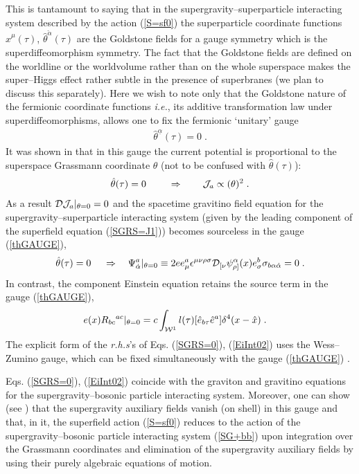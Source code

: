 \documentclass[a4paper,11pt]{article}
\begin{document}
This is tantamount to saying that 
in the supergravity--superparticle interacting system described by the action 
(\ref{S=sf0})
the superparticle coordinate functions $\hat{x}^\mu(\tau)$, 
$\hat{\theta}^{\check{\alpha}}(\tau)$ 
are  the Goldstone fields for a gauge symmetry which is the 
superdiffeomorphism symmetry. The fact that the Goldstone fields are 
defined on 
the worldline or the worldvolume rather than on the whole 
superspace makes the 
super--Higgs effect \cite{Volkov} rather subtle 
in the presence of superbranes (we plan to discuss this separately). 
Here we wish to note only that the Goldstone nature of the 
fermionic coordinate 
functions {\it i.e.}, its additive transformation law under 
superdiffeomorphisms, allows one to fix the fermionic `unitary' gauge 
\begin{eqnarray}\label{thGAUGE}
\hat{\theta}^{\underline{\alpha}}(\tau) = 0 \;  . 
\end{eqnarray}
It was shown in \cite{BAIL4} that in this gauge the current 
potential is proportional to the superspace Grassmann coordinate 
$\theta$ (not to be confused with $\hat{\theta}(\tau)$): 
\begin{eqnarray} \label{Ja=th3}
\hat{\theta}(\tau)=0 \;  
\qquad \Rightarrow \qquad 
{\cal J}_a \propto (\theta)^2 \; . 
\end{eqnarray}
As a result ${\cal D}{\cal J}_a\vert_{\theta =0}=0$ and the 
spacetime gravitino field equation for the supergravity--superparticle 
interacting system (given by the leading component of the 
superfield equation (\ref{SGRS=J1})) becomes sourceless
in the gauge (\ref{thGAUGE}), 
\begin{eqnarray}\label{SGRS=0}
\hat{\theta}(\tau)=0 \;  
\quad \Rightarrow  \quad
\Psi^a_{\dot\alpha} \vert_{\theta=0}\equiv 
2 e e_\mu^a \epsilon^{\mu\nu\rho\sigma} {\cal D}_{[\nu}\psi_{\rho]}^{\alpha}(x)
e^b_\sigma\sigma_{b\alpha\dot{\alpha}}=0 \; .
\end{eqnarray} 
In contrast, the component Einstein equation retains the source term 
in the gauge (\ref{thGAUGE}),  
\begin{eqnarray}\label{EiInt02} 
& e(x) 
R_{bc}{}^{ac} \vert_{\theta=0} = c 
\int_{{\cal W}^1}  
 l(\tau )[ \hat{e}_{b\tau} \hat{e}^{a}] 
\delta^4(x-\hat{x}) \; . 
\end{eqnarray}
The explicit form of the {\it r.h.s}'s of Eqs. (\ref{SGRS=0}), (\ref{EiInt02}) 
uses the Wess--Zumino gauge, which 
can be fixed simultaneously with the gauge  (\ref{thGAUGE}) \cite{BAIL4}.

Eqs. (\ref{SGRS=0}), (\ref{EiInt02}) coincide with the graviton and 
gravitino equations for the supergravity--bosonic particle interacting 
system.  Moreover, one can show (see \cite{BAIL}) that the supergravity 
auxiliary fields vanish (on shell) in this gauge and that,  
in it, the 
superfield action (\ref{S=sf0}) reduces to the action of the 
supergravity--bosonic particle interacting system 
(\ref{SG+bb}) upon integration over the Grassmann coordinates and 
elimination of the supergravity auxiliary fields by 
using  their purely algebraic equations of motion.
\end{document}
